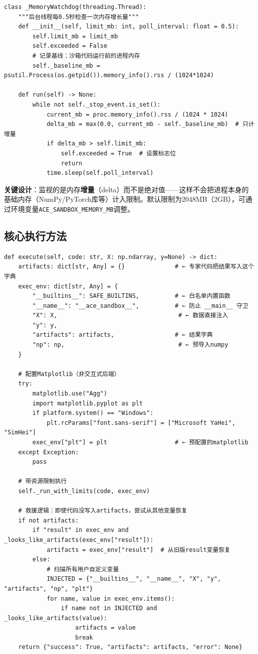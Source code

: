 \documentclass[11pt,a4paper]{ctexbook}
\begin{document}
\begin{verbatim}
class _MemoryWatchdog(threading.Thread):
    """后台线程每0.5秒检查一次内存增长量"""
    def __init__(self, limit_mb: int, poll_interval: float = 0.5):
        self.limit_mb = limit_mb
        self.exceeded = False
        # 记录基线：沙箱代码运行前的进程内存
        self._baseline_mb = psutil.Process(os.getpid()).memory_info().rss / (1024*1024)

    def run(self) -> None:
        while not self._stop_event.is_set():
            current_mb = proc.memory_info().rss / (1024 * 1024)
            delta_mb = max(0.0, current_mb - self._baseline_mb)  # 只计增量
            if delta_mb > self.limit_mb:
                self.exceeded = True  # 设置标志位
                return
            time.sleep(self.poll_interval)
\end{verbatim}

\textbf{关键设计}：监视的是内存\textbf{增量}（delta）而不是绝对值——这样不会把进程本身的基础内存（NumPy/PyTorch库等）计入限制。默认限制为2048MB（2GB），可通过环境变量\verb|ACE_SANDBOX_MEMORY_MB|调整。

\subsection{核心执行方法}

\begin{verbatim}
def execute(self, code: str, X: np.ndarray, y=None) -> dict:
    artifacts: dict[str, Any] = {}              # ← 专家代码把结果写入这个字典
    exec_env: dict[str, Any] = {
        "__builtins__": SAFE_BUILTINS,          # ← 白名单内置函数
        "__name__": "__ace_sandbox__",          # ← 防止 __main__ 守卫
        "X": X,                                  # ← 数据直接注入
        "y": y,
        "artifacts": artifacts,                 # ← 结果字典
        "np": np,                                # ← 预导入numpy
    }

    # 配置Matplotlib（非交互式后端）
    try:
        matplotlib.use("Agg")
        import matplotlib.pyplot as plt
        if platform.system() == "Windows":
            plt.rcParams["font.sans-serif"] = ["Microsoft YaHei", "SimHei"]
        exec_env["plt"] = plt                   # ← 预配置的matplotlib
    except Exception:
        pass

    # 带资源限制执行
    self._run_with_limits(code, exec_env)

    # 救援逻辑：即使代码没写入artifacts，尝试从其他变量恢复
    if not artifacts:
        if "result" in exec_env and _looks_like_artifacts(exec_env["result"]):
            artifacts = exec_env["result"]  # 从旧版result变量恢复
        else:
            # 扫描所有用户自定义变量
            INJECTED = {"__builtins__", "__name__", "X", "y", "artifacts", "np", "plt"}
            for name, value in exec_env.items():
                if name not in INJECTED and _looks_like_artifacts(value):
                    artifacts = value
                    break
    return {"success": True, "artifacts": artifacts, "error": None}
\end{verbatim}
\end{document}

